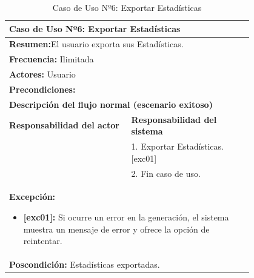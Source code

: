 \begin{table}[H]
    \centering
    \caption{Caso de Uso Nº6: Exportar Estadísticas}
    
    \begin{tabular}{| p{0.4\linewidth} | p{0.4\linewidth} |}
        \hline
        \multicolumn{2}{|l|}{\textbf{Caso de Uso Nº6:} Exportar Estadísticas} \\
        \hline
        \multicolumn{2}{|l|}{\textbf{Resumen:}El usuario exporta sus Estadísticas.} \\
        \hline
        \multicolumn{2}{|l|}{\textbf{Frecuencia:}  Ilimitada} \\
        \hline
        \multicolumn{2}{|l|}{\textbf{Actores:}  Usuario} \\
        \hline
        \multicolumn{2}{|l|}{\textbf{Precondiciones:}} \\
        \hline
        \multicolumn{2}{|l|}{\textbf{Descripción del flujo normal (escenario exitoso)} } \\
        \hline
        \textbf{Responsabilidad del actor} & \textbf{Responsabilidad del sistema}\\
            & 1. Exportar Estadísticas. [exc01]\\
            & 2. Fin caso de uso. \\
        \hline
        \multicolumn{2}{|p{0.8\linewidth}|}{
            \textbf{Excepción:}
            \begin{itemize}
                \item \textbf{[exc01]:} Si ocurre un error en la generación, el sistema muestra un mensaje de error y ofrece la opción de reintentar.
            \end{itemize}}\\
        \hline
        \multicolumn{2}{|l|}{\textbf{Poscondición:}  Estadísticas exportadas.} \\
        \hline
    \end{tabular}

    \label{table:6}
\end{table}

